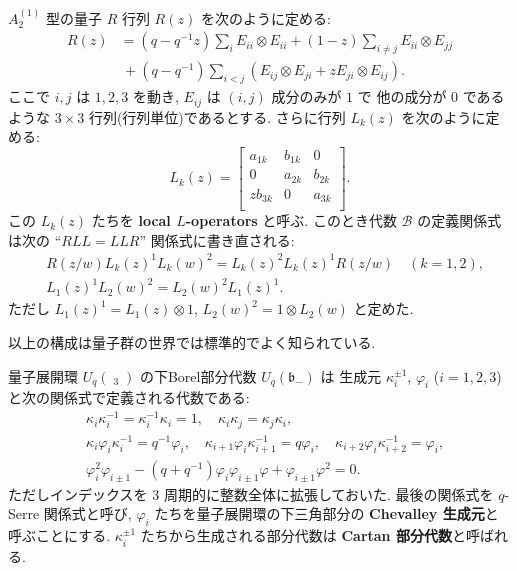 \documentclass[12pt,twoside,dvipdfm]{msjproc}
\theoremstyle{definition} %
\theoremstyle{definition} %
\theoremstyle{definition} %
\numberwithin{theorem}{section}
\numberwithin{equation}{section}
\numberwithin{figure}{section}
\numberwithin{table}{section}
\newcommand\bor{\mathfrak{b}}
\newcommand\B{\mathcal{B}}
\newcommand\glhat{\mathop{\widehat{\mathrm{gl}}}\nolimits}
\begin{document}
$A^{(1)}_2$ 型の量子 $R$ 行列 $R(z)$ を次のように定める:
\begin{align*}
 R(z)
 & = (q-q^{-1}z) \sum_i E_{ii}\otimes E_{ii}
 + (1-z)       \sum_{i\ne j} E_{ii}\otimes E_{jj}
 \\ & \,
 + (q-q^{-1})  \sum_{i<j} (E_{ij}\otimes E_{ji} + z E_{ji}\otimes E_{ij}).
\end{align*}
ここで $i,j$ は $1,2,3$ を動き, $E_{ij}$ は $(i,j)$ 成分のみが $1$ で
他の成分が $0$ であるような $3\times 3$ 行列(行列単位)であるとする. 
さらに行列 $L_k(z)$ を次のように定める:
\begin{equation*}
 L_k(z) =
 \begin{bmatrix}
    a_{1k} & b_{1k} & 0 \\
    0 & a_{2k} & b_{2k} \\
  z b_{3k} & 0 & a_{3k} \\
 \end{bmatrix}.
\end{equation*}
この $L_k(z)$ たちを {\bf local $L$-operators} と呼ぶ.
このとき代数 $\B$ の定義関係式は次の ``$RLL=LLR$'' 関係式に書き直される:
\begin{align*}
 &
 R(z/w)L_k(z)^1 L_k(w)^2 = L_k(z)^2 L_k(z)^1 R(z/w)  \quad (k=1,2), 
 \\ &
 L_1(z)^1 L_2(w)^2 = L_2(w)^2 L_1(z)^1.
\end{align*}
ただし $L_1(z)^1=L_1(z)\otimes 1$, $L_2(w)^2=1\otimes L_2(w)$ と定めた.

以上の構成は量子群の世界では標準的でよく知られている.

量子展開環 $U_q(\glhat_3)$ の下Borel部分代数 $U_q(\bor_-)$ は
生成元 $\kappa_i^{\pm 1}$, $\varphi_i$ ($i=1,2,3$) と次の関係式で定義される代数である:
\begin{align*}
 &
 \kappa_i\kappa_i^{-1} = \kappa_i^{-1}\kappa_i = 1, \quad
 \kappa_i\kappa_j = \kappa_j\kappa_i,
 \\ &
 \kappa_i \varphi_i \kappa_i^{-1} = q^{-1} \varphi_i, \quad
 \kappa_{i+1} \varphi_i \kappa_{i+1}^{-1} = q \varphi_i, \quad
 \kappa_{i+2} \varphi_i \kappa_{i+2}^{-1} = \varphi_i,
 \\ &
 \varphi_i^2 \varphi_{i\pm1} 
 - (q+q^{-1})\varphi_i\varphi_{i\pm1}\varphi
 + \varphi_{i\pm1}\varphi^2 = 0.
\end{align*}
ただしインデックスを $3$ 周期的に整数全体に拡張しておいた.
最後の関係式を $q$-Serre 関係式と呼び, 
$\varphi_i$ たちを量子展開環の下三角部分の {\bf Chevalley 生成元}と呼ぶことにする.
$\kappa_i^{\pm1}$ たちから生成される部分代数は {\bf Cartan 部分代数}と呼ばれる.
\end{document}

